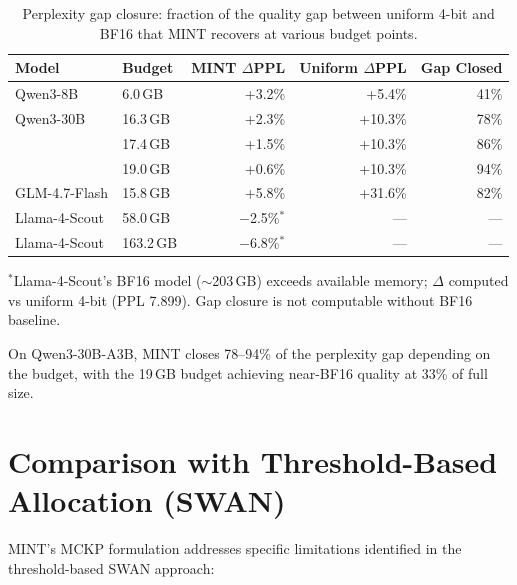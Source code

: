 \documentclass{article}
\begin{document}
\begin{table}[h]
\centering
\caption{Perplexity gap closure: fraction of the quality gap between uniform 4-bit and BF16 that MINT recovers at various budget points.}
\label{tab:gap_closure}
\begin{tabular}{llrrr}
\toprule
Model & Budget & MINT $\Delta$PPL & Uniform $\Delta$PPL & Gap Closed \\
\midrule
Qwen3-8B & 6.0\,GB & +3.2\% & +5.4\% & 41\% \\
\midrule
Qwen3-30B & 16.3\,GB & +2.3\% & +10.3\% & 78\% \\
 & 17.4\,GB & +1.5\% & +10.3\% & 86\% \\
 & 19.0\,GB & +0.6\% & +10.3\% & 94\% \\
\midrule
GLM-4.7-Flash & 15.8\,GB & +5.8\% & +31.6\% & 82\% \\
\midrule
Llama-4-Scout & 58.0\,GB & $-$2.5\%$^*$ & --- & --- \\
Llama-4-Scout & 163.2\,GB & $-$6.8\%$^*$ & --- & --- \\
\bottomrule
\end{tabular}
\end{table}

$^*$Llama-4-Scout's BF16 model (${\sim}$203\,GB) exceeds available memory; $\Delta$ computed vs uniform 4-bit (PPL 7.899). Gap closure is not computable without BF16 baseline.

On Qwen3-30B-A3B, MINT closes 78--94\% of the perplexity gap depending on the budget, with the 19\,GB budget achieving near-BF16 quality at 33\% of full size.

\section{Comparison with Threshold-Based Allocation (SWAN)}
\label{app:v1_comparison}

MINT's MCKP formulation addresses specific limitations identified in the threshold-based SWAN approach:
\end{document}
